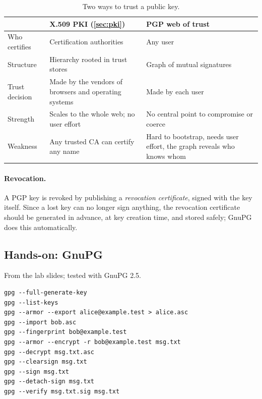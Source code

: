 \begin{table}[H]
\centering
\caption{Two ways to trust a public key.}
\label{tab:pki-vs-wot}
\begin{tabularx}{\textwidth}{@{}l X X@{}}
\toprule
 & X.509 PKI (\cref{sec:pki}) & PGP web of trust \\
\midrule
Who certifies & Certification authorities & Any user \\
Structure & Hierarchy rooted in trust stores & Graph of mutual signatures \\
Trust decision & Made by the vendors of browsers and operating systems & Made by each user \\
Strength & Scales to the whole web; no user effort & No central point to compromise or coerce \\
Weakness & Any trusted CA can certify any name & Hard to bootstrap, needs user effort, the graph reveals who knows whom \\
\bottomrule
\end{tabularx}
\end{table}

\paragraph{Revocation.} A PGP key is revoked by publishing a \emph{revocation certificate}, signed with the key itself. Since a lost key can no longer sign anything, the revocation certificate should be generated in advance, at key creation time, and stored safely; GnuPG does this automatically.

\subsection{Hands-on: GnuPG}

From the lab slides; tested with GnuPG 2.5.

\begin{verbatim}
gpg --full-generate-key
gpg --list-keys
gpg --armor --export alice@example.test > alice.asc
gpg --import bob.asc
gpg --fingerprint bob@example.test
gpg --armor --encrypt -r bob@example.test msg.txt
gpg --decrypt msg.txt.asc
gpg --clearsign msg.txt
gpg --sign msg.txt
gpg --detach-sign msg.txt
gpg --verify msg.txt.sig msg.txt
\end{verbatim}

